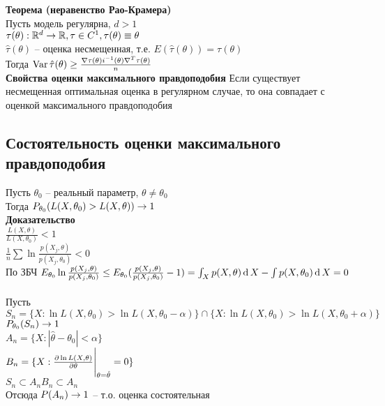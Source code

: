 \documentclass[12pt]{article}
\begin{document}
\textbf{Теорема (неравенство Рао-Крамера)}\\
Пусть модель регулярна, $d>1$\\
$\tau(\theta): \mathbb{R}^d \rightarrow \mathbb{R}, \tau \in C^1, \tau(\theta) \equiv \theta$\\
$\hat \tau(\theta)$ -- оценка несмещенная, т.е. $E(\hat \tau(\theta)) = \tau(\theta)$\\
Тогда $\operatorname{Var} \hat \tau(\theta) \geq \frac{\nabla \tau(\theta) i^{-1}(\theta) \nabla^T \tau(\theta)}{n}$\\
\textbf{Свойства оценки максимального правдоподобия}
Если существует несмещенная оптимальная оценка в регулярном случае, то она совпадает с оценкой максимального правдоподобия\\
\subsection{Состоятельность оценки максимального правдоподобия}
Пусть $\theta_0$ -- реальный параметр, $\theta \neq \theta_0$\\
Тогда $P_{\theta_0} (L(X, \theta_0) > L(X, \theta)) \rightarrow 1$\\
\textbf{Доказательство}\\
$\frac{L(X, \theta)}{L(X, \theta_0)} < 1$\\
$\frac1n\sum \ln \frac{p(X_j, \theta)}{p(X_j, \theta_0)} < 0$\\
По ЗБЧ $E_{\theta_0} \ln\frac{p(X_j, \theta)}{p(X_j, \theta_0)} \leq E_{\theta_0} (\frac{p(X_j, \theta)}{p(X_j, \theta_0)} - 1) = \int_X p(X, \theta) \operatorname{d} X - \int p(X, \theta_0) \operatorname{d} X = 0$\\\\
Пусть $S_n = \{X: \ln L(X, \theta_0) > \ln L(X, \theta_0 - \alpha)\} \cap \{X: \ln L(X, \theta_0) > \ln L(X, \theta_0 + \alpha)\}$\\
$P_{\theta_0}(S_n) \rightarrow 1$\\
$A_n = \{X: |\hat \theta - \theta_0| < \alpha\}$\\
$B_n = \{X: \frac{\partial \ln L(X, \theta)}{\partial \theta} \Biggr|_{\theta=\hat \theta} = 0\}$\\
$S_n \subset A_nB_n \subset A_n$\\
Отсюда $P(A_n) \rightarrow 1$ --  т.о. оценка состоятельная
\end{document}
